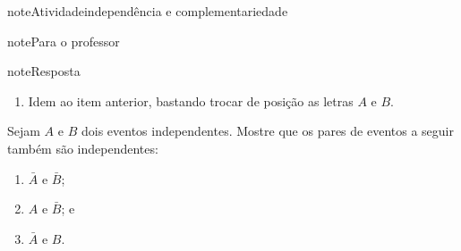 \begin{sphinxadmonition}{note}{Atividade}{independência e complementariedade}
\begin{sphinxadmonition}{note}{Para o professor}
\begin{sphinxadmonition}{note}{Resposta}
\begin{enumerate}
\item {} 
Idem ao item anterior, bastando trocar de posição as letras \(A\)  e \(B\).

\end{enumerate}
\end{sphinxadmonition}
\end{sphinxadmonition}

Sejam \(A\) e \(B\) dois eventos independentes.  Mostre que os pares de eventos a seguir também são independentes:
\begin{enumerate}
\item {} 
\(\bar{A}\) e \(\bar{B}\);

\item {} 
\(A\) e \(\bar{B}\); e

\item {} 
\(\bar{A}\) e \(B\).

\end{enumerate}
\end{sphinxadmonition}
